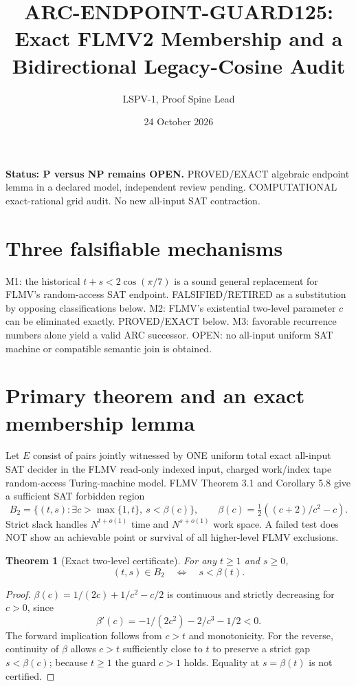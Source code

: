 \documentclass[11pt]{article}
\title{ARC-ENDPOINT-GUARD125: Exact FLMV2 Membership and a Bidirectional Legacy-Cosine Audit}
\author{LSPV-1, Proof Spine Lead}
\date{24 October 2026}
\newtheorem{theorem}{Theorem}
\begin{document}
\maketitle
\noindent\textbf{Status: P versus NP remains OPEN.} PROVED/EXACT algebraic endpoint lemma in a declared model, independent review pending. COMPUTATIONAL exact-rational grid audit. No new all-input SAT contraction.

\section{Three falsifiable mechanisms}
M1: the historical $t+s<2\cos(\pi/7)$ is a sound general replacement for FLMV's random-access SAT endpoint. FALSIFIED/RETIRED as a substitution by opposing classifications below. M2: FLMV's existential two-level parameter $c$ can be eliminated exactly. PROVED/EXACT below. M3: favorable recurrence numbers alone yield a valid ARC successor. OPEN: no all-input uniform SAT machine or compatible semantic join is obtained.

\section{Primary theorem and an exact membership lemma}
Let $E$ consist of pairs jointly witnessed by ONE uniform total exact all-input SAT decider in the FLMV read-only indexed input, charged work/index tape random-access Turing-machine model. FLMV Theorem 3.1 and Corollary 5.8 give a sufficient SAT forbidden region
\[
B_2=\{(t,s):\exists c>\max\{1,t\},\ s<\beta(c)\},\qquad
\beta(c)=\tfrac12((c+2)/c^2-c).
\]
Strict slack handles $N^{t+o(1)}$ time and $N^{s+o(1)}$ work space. A failed test does NOT show an achievable point or survival of all higher-level FLMV exclusions.

\begin{theorem}[Exact two-level certificate]
For any $t\ge1$ and $s\ge0$,
\[
(t,s)\in B_2\quad\Longleftrightarrow\quad s<\beta(t).
\]
\end{theorem}
\begin{proof}
$\beta(c)=1/(2c)+1/c^2-c/2$ is continuous and strictly decreasing for $c>0$, since
\[
\beta'(c)=-1/(2c^2)-2/c^3-1/2<0.
\]
The forward implication follows from $c>t$ and monotonicity. For the reverse, continuity of $\beta$ allows $c>t$ sufficiently close to $t$ to preserve a strict gap $s<\beta(c)$; because $t\ge1$ the guard $c>1$ holds. Equality at $s=\beta(t)$ is not certified.
\end{proof}
\end{document}
